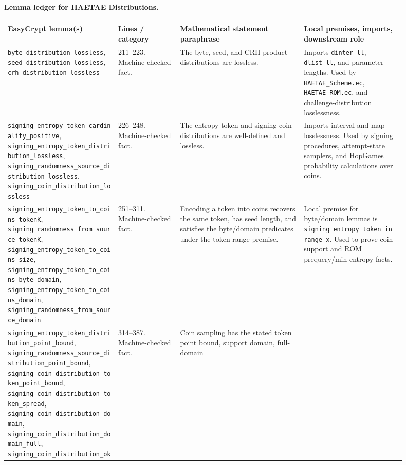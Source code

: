 \documentclass[11pt]{report}
\DeclareRobustCommand{\file}[1]{\ifmmode\text{\nolinkurl{#1}}\else\nolinkurl{#1}\fi}
\DeclareRobustCommand{\ec}[1]{\ifmmode\text{\nolinkurl{#1}}\else\nolinkurl{#1}\fi}
\theoremstyle{definition}
\theoremstyle{plain}
\begin{document}
\paragraph{Lemma ledger for HAETAE Distributions.}
{\footnotesize
\begin{longtable}{p{0.25\linewidth}p{0.14\linewidth}p{0.28\linewidth}p{0.23\linewidth}}
\toprule
\textbf{EasyCrypt lemma(s)} & \textbf{Lines / category} &
\textbf{Mathematical statement paraphrase} &
\textbf{Local premises, imports, downstream role} \\
\midrule
\ec{byte\_distribution\_lossless},
\ec{seed\_distribution\_lossless},
\ec{crh\_distribution\_lossless} &
211--223. Machine-checked fact. &
The byte, seed, and CRH product distributions are lossless. &
Imports \ec{dinter\_ll}, \ec{dlist\_ll}, and parameter lengths.  Used by
\file{HAETAE\_Scheme.ec}, \file{HAETAE\_ROM.ec}, and challenge-distribution
losslessness. \\
\midrule
\ec{signing\_entropy\_token\_cardinality\_positive},
\ec{signing\_entropy\_token\_distribution\_lossless},
\ec{signing\_randomness\_source\_distribution\_lossless},
\ec{signing\_coin\_distribution\_lossless} &
226--248. Machine-checked fact. &
The entropy-token and signing-coin distributions are well-defined and
lossless. &
Imports interval and map losslessness.  Used by signing procedures,
attempt-state samplers, and HopGames probability calculations over coins. \\
\midrule
\ec{signing\_entropy\_token\_to\_coins\_tokenK},
\ec{signing\_randomness\_from\_source\_tokenK},
\ec{signing\_entropy\_token\_to\_coins\_size},
\ec{signing\_entropy\_token\_to\_coins\_byte\_domain},
\ec{signing\_entropy\_token\_to\_coins\_domain},
\ec{signing\_randomness\_from\_source\_domain} &
251--311. Machine-checked fact. &
Encoding a token into coins recovers the same token, has seed length, and
satisfies the byte/domain predicates under the token-range premise. &
Local premise for byte/domain lemmas is
\ec{signing\_entropy\_token\_in\_range x}.  Used to prove coin support and
ROM prequery/min-entropy facts. \\
\midrule
\ec{signing\_entropy\_token\_distribution\_point\_bound},
\ec{signing\_randomness\_source\_distribution\_point\_bound},
\ec{signing\_coin\_distribution\_token\_point\_bound},
\ec{signing\_coin\_distribution\_token\_spread},
\ec{signing\_coin\_distribution\_domain},
\ec{signing\_coin\_distribution\_domain\_full},
\ec{signing\_coin\_distribution\_ok} &
314--387. Machine-checked fact. &
Coin sampling has the stated token point bound, support domain, full-domain

\end{longtable}}
\end{document}
